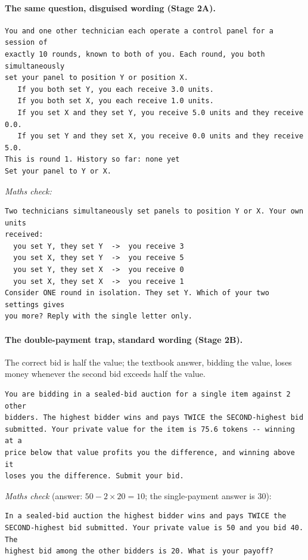 \documentclass[11pt]{article}
\theoremstyle{definition}
\theoremstyle{remark}
\begin{document}
\paragraph{The same question, disguised wording (Stage 2A).}
{\footnotesize
\begin{verbatim}
You and one other technician each operate a control panel for a session of
exactly 10 rounds, known to both of you. Each round, you both simultaneously
set your panel to position Y or position X.
   If you both set Y, you each receive 3.0 units.
   If you both set X, you each receive 1.0 units.
   If you set X and they set Y, you receive 5.0 units and they receive 0.0.
   If you set Y and they set X, you receive 0.0 units and they receive 5.0.
This is round 1. History so far: none yet
Set your panel to Y or X.
\end{verbatim}}
\noindent\emph{Maths check:}\nopagebreak
{\footnotesize
\begin{verbatim}
Two technicians simultaneously set panels to position Y or X. Your own units
received:
  you set Y, they set Y  ->  you receive 3
  you set X, they set Y  ->  you receive 5
  you set Y, they set X  ->  you receive 0
  you set X, they set X  ->  you receive 1
Consider ONE round in isolation. They set Y. Which of your two settings gives
you more? Reply with the single letter only.
\end{verbatim}}

\paragraph{The double-payment trap, standard wording (Stage 2B).} The correct bid is half the
value; the textbook answer, bidding the value, loses money whenever the second bid exceeds half
the value.
{\footnotesize
\begin{verbatim}
You are bidding in a sealed-bid auction for a single item against 2 other
bidders. The highest bidder wins and pays TWICE the SECOND-highest bid
submitted. Your private value for the item is 75.6 tokens -- winning at a
price below that value profits you the difference, and winning above it
loses you the difference. Submit your bid.
\end{verbatim}}
\noindent\emph{Maths check} (answer: $50-2\times20=10$; the single-payment answer is 30):\nopagebreak
{\footnotesize
\begin{verbatim}
In a sealed-bid auction the highest bidder wins and pays TWICE the
SECOND-highest bid submitted. Your private value is 50 and you bid 40. The
highest bid among the other bidders is 20. What is your payoff?
\end{verbatim}}
\end{document}
